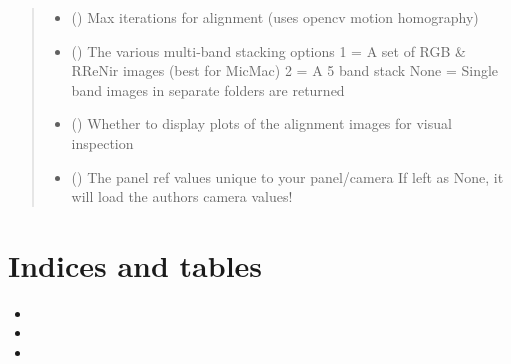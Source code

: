 \documentclass[letterpaper,10pt,english]{sphinxmanual}
\begin{document}
\begin{fulllineitems}
\begin{quote}
\begin{description}
\begin{itemize}
\item {} 
 () \textendash{} Max iterations for alignment (uses opencv motion homography)

\item {} 
 () \textendash{} The various multi-band stacking options
1 = A set of RGB \& RReNir images (best for MicMac)
2 = A 5 band stack
None = Single band images in separate folders are returned

\item {} 
 () \textendash{} Whether to display plots of the alignment images for visual inspection

\item {} 
 () \textendash{} The panel ref values unique to your panel/camera
If left as None, it will load the authors camera values!

\end{itemize}

\end{description}\end{quote}

\end{fulllineitems}



\chapter{Indices and tables}
\label{\detokenize{index:indices-and-tables}}\begin{itemize}
\item {} 

\item {} 

\item {} 

\end{itemize}


\renewcommand{\indexname}{Python Module Index}
\begin{sphinxtheindex}
\let\bigletter\sphinxstyleindexlettergroup
\bigletter{d}
\item\relax{}
\indexspace
\bigletter{m}
\item\relax{}
\indexspace
\bigletter{o}
\item\relax{}
\indexspace
\bigletter{u}
\item\relax{}
\end{sphinxtheindex}

\renewcommand{\indexname}{Index}
\printindex
\end{document}
